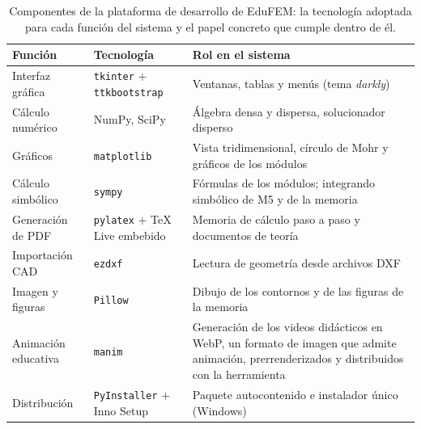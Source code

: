 \begin{table}[htbp]
\centering
\caption[Componentes de la plataforma de desarrollo de EduFEM.]{Componentes de la plataforma de desarrollo de EduFEM: la tecnología adoptada para cada función del sistema y el papel concreto que cumple dentro de él.}
\label{tab:stack}
\setlength{\tabcolsep}{4pt}
\begin{tabular}{@{}l >{\raggedright\arraybackslash}p{4.0cm} >{\raggedright\arraybackslash}p{6.9cm}@{}}
\toprule
\textbf{Función} & \textbf{Tecnología} & \textbf{Rol en el sistema} \\
\midrule
Interfaz gráfica      & \texttt{tkinter} + \texttt{ttkbootstrap} & Ventanas, tablas y menús (tema \emph{darkly}) \\
Cálculo numérico      & NumPy, SciPy                              & Álgebra densa y dispersa, solucionador disperso \\
Gráficos              & \texttt{matplotlib}                      & Vista tridimensional, círculo de Mohr y gráficos de los módulos \\
Cálculo simbólico     & \texttt{sympy}                           & Fórmulas de los módulos; integrando simbólico de M5 y de la memoria \\
Generación de PDF     & \texttt{pylatex} + \TeX{} Live embebido    & Memoria de cálculo paso a paso y documentos de teoría \\
Importación CAD       & \texttt{ezdxf}                            & Lectura de geometría desde archivos DXF \\
Imagen y figuras      & \texttt{Pillow}                           & Dibujo de los contornos y de las figuras de la memoria \\
Animación educativa   & \texttt{manim}                            & Generación de los videos didácticos en WebP, un formato de imagen que admite animación, prerrenderizados y distribuidos con la herramienta \\
Distribución          & \texttt{PyInstaller} + Inno Setup         & Paquete autocontenido e instalador único (Windows) \\
\bottomrule
\end{tabular}
{\singlespacing{}}
\end{table}

